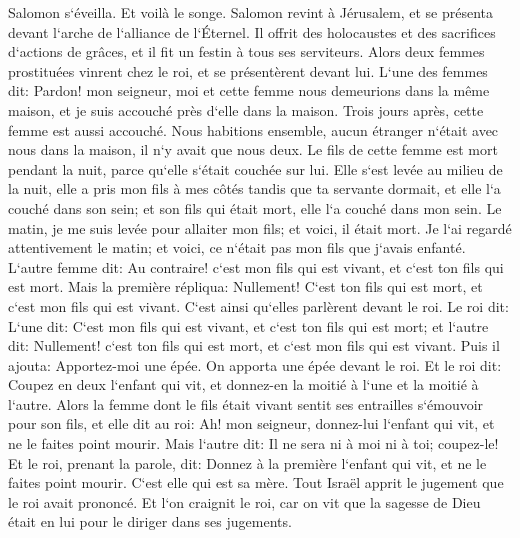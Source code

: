 \verse Salomon s`éveilla. Et voilà le songe. Salomon revint à Jérusalem, et se présenta devant l`arche de l`alliance de l`Éternel. Il offrit des holocaustes et des sacrifices d`actions de grâces, et il fit un festin à tous ses serviteurs. 
\verse Alors deux femmes prostituées vinrent chez le roi, et se présentèrent devant lui. 
\verse L`une des femmes dit: Pardon! mon seigneur, moi et cette femme nous demeurions dans la même maison, et je suis accouché près d`elle dans la maison. 
\verse Trois jours après, cette femme est aussi accouché. Nous habitions ensemble, aucun étranger n`était avec nous dans la maison, il n`y avait que nous deux. 
\verse Le fils de cette femme est mort pendant la nuit, parce qu`elle s`était couchée sur lui. 
\verse Elle s`est levée au milieu de la nuit, elle a pris mon fils à mes côtés tandis que ta servante dormait, et elle l`a couché dans son sein; et son fils qui était mort, elle l`a couché dans mon sein. 
\verse Le matin, je me suis levée pour allaiter mon fils; et voici, il était mort. Je l`ai regardé attentivement le matin; et voici, ce n`était pas mon fils que j`avais enfanté. 
\verse L`autre femme dit: Au contraire! c`est mon fils qui est vivant, et c`est ton fils qui est mort. Mais la première répliqua: Nullement! C`est ton fils qui est mort, et c`est mon fils qui est vivant. C`est ainsi qu`elles parlèrent devant le roi. 
\verse Le roi dit: L`une dit: C`est mon fils qui est vivant, et c`est ton fils qui est mort; et l`autre dit: Nullement! c`est ton fils qui est mort, et c`est mon fils qui est vivant. 
\verse Puis il ajouta: Apportez-moi une épée. On apporta une épée devant le roi. 
\verse Et le roi dit: Coupez en deux l`enfant qui vit, et donnez-en la moitié à l`une et la moitié à l`autre. 
\verse Alors la femme dont le fils était vivant sentit ses entrailles s`émouvoir pour son fils, et elle dit au roi: Ah! mon seigneur, donnez-lui l`enfant qui vit, et ne le faites point mourir. Mais l`autre dit: Il ne sera ni à moi ni à toi; coupez-le! 
\verse Et le roi, prenant la parole, dit: Donnez à la première l`enfant qui vit, et ne le faites point mourir. C`est elle qui est sa mère. 
\verse Tout Israël apprit le jugement que le roi avait prononcé. Et l`on craignit le roi, car on vit que la sagesse de Dieu était en lui pour le diriger dans ses jugements. 

\chapter{}

